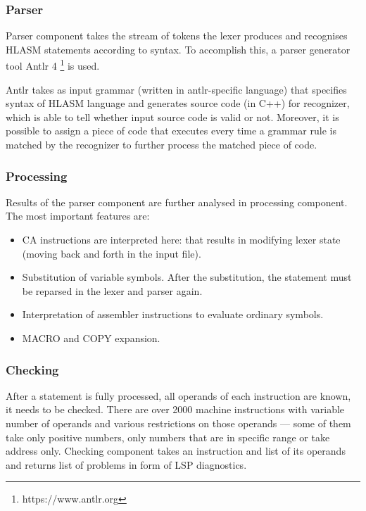 \subsubsection{Parser}

Parser component takes the stream of tokens the lexer produces and recognises HLASM statements according to syntax. To accomplish this, a parser generator tool Antlr 4 \footnote{https://www.antlr.org} is used.

Antlr takes as input grammar (written in antlr-specific language) that specifies syntax of HLASM language and generates source code (in C++) for recognizer, which is able to tell whether input source code is valid or not. Moreover, it is possible to assign a piece of code that executes every time a grammar rule is matched by the recognizer to further process the matched piece of code.



\subsubsection{Processing}

Results of the parser component are further analysed in processing component. The most important features are:

\begin{itemize}
	\item CA instructions are interpreted here: that results in modifying lexer state (moving back and forth in the input file).
	\item Substitution of variable symbols. After the substitution, the statement must be reparsed in the lexer and parser again.
	\item Interpretation of assembler instructions to evaluate ordinary symbols.
	\item MACRO and COPY expansion.
\end{itemize}

\subsubsection{Checking}
After a statement is fully processed, all operands of each instruction are known, it needs to be checked. There are over 2000 machine instructions with variable number of operands and various restrictions on those operands --- some of them take only positive numbers, only numbers that are in specific range or take address only. Checking component takes an instruction and list of its operands and returns list of problems in form of LSP diagnostics.


